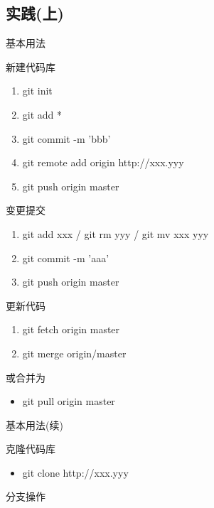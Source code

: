 \documentclass[CJK, 10pt]{beamer}
\begin{document}
\begin{CJK*}{UTF8}{gbsn}
\section{实践(上)}
\begin{frame}{基本用法}
    \begin{block}{新建代码库}
        \begin{enumerate}
            \item git init
            \item git add *
            \item git commit -m 'bbb'
            \item git remote add origin http://xxx.yyy
            \item git push origin master
        \end{enumerate}
    \end{block}
    \begin{block}{变更提交}
        \begin{enumerate}
            \item git add xxx / git rm yyy / git mv xxx yyy
            \item git commit -m 'aaa'
            \item git push origin master
        \end{enumerate}
    \end{block}
    \begin{block}{更新代码}
        \begin{enumerate}
            \item git fetch origin master
            \item git merge origin/master
        \end{enumerate}
        或合并为
        \begin{itemize}
            \item git pull origin master
        \end{itemize}
    \end{block}
\end{frame}
\begin{frame}{基本用法(续)}
    \begin{block}{克隆代码库}
        \begin{itemize}
            \item git clone http://xxx.yyy
        \end{itemize}
    \end{block}
    \begin{block}{分支操作}
        \begin{enumerate}

\end{enumerate}
\end{block}
\end{frame}
\end{CJK*}
\end{document}
